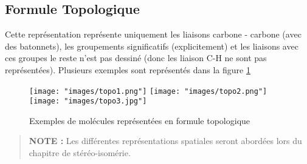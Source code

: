\subsection{Formule Topologique}
Cette représentation représente uniquement les liaisons carbone - carbone (avec des batonnets), les groupements significatifs (explicitement) et les liaisons avec ces groupes le reste n'est pas dessiné (donc les liaison C-H ne sont pas représentées). Plusieurs exemples sont représentés dans la figure \ref{fig:topo_example}
\begin{figure}[ht]
    \centering
    \texttt{[image: "images/topo1.png"]}
    \texttt{[image: "images/topo2.png"]}
    \texttt{[image: "images/topo3.jpg"]}
    \caption{Exemples de molécules représentées en formule topologique}
    \label{fig:topo_example}
\end{figure}
\begin{quote}
    \textbf{NOTE :} Les différentes représentations spatiales seront abordées lors du chapitre de stéréo-isomérie.
\end{quote}